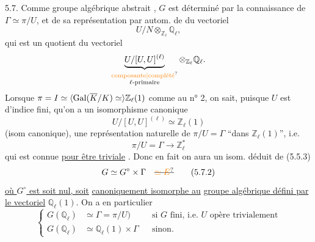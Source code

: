 5.7. Comme groupe algébrique abstrait , $G$ est déterminé par la connaissance de $\Gamma\simeq\pi/U$, et de sa représentation par autom. de  du vectoriel 
\[
U/N\otimes_{\mathbb Z_\ell}\mathbb Q_\ell,
\]
qui est un quotient du vectoriel
\[
\underbrace{U/[U,U]^{(\ell)}}_{\substack{\text{\unsure{composante|complété}}\\\ell\text{-primaire}}}\otimes_{\mathbb Z_\ell}\mathbb Q_\ell.
\]
Lorsque $\pi=I\simeq\inserted{\operatorname{Gal}(\overline K/K)\simeq}\mathbb Z_\ell(1)$ comme au n° 2,  on sait,  puisque $U$ est d'indice fini, qu'on a  un isomorphisme canonique
\[
U/[U,U]^{(\ell)}\simeq\mathbb Z_\ell(1)
\tag*{(5.7.1)}
\]
(isom canonique),  une représentation naturelle de $\pi/U=\Gamma$ ``dans $\mathbb Z_\ell(1)$'', i.e.
\[
\pi/U=\Gamma\longrightarrow\mathbb Z_\ell^*
\]
qui est connue \uline{pour être triviale} . Donc en fait on aura un isom.  déduit de (5.5.3)
\[
G\simeq G^\circ\times\Gamma\quad\deleted{\unsure{\simeq E}}
\tag*{(5.7.2)}
\]
 \uline{où $G^\circ$ est soit nul, soit}  \uline{canoniquement isomorphe au}  \uline{groupe algébrique défini par le vectoriel} $\mathbb Q_\ell(1)$. On a en particulier
\[
\left\{\begin{aligned}
G(\mathbb Q_\ell)&\simeq\Gamma=\pi/U)&&\text{si }G\text{ fini, i.e. }U\text{ opère trivialement}\\
G(\mathbb Q_\ell)&\simeq\mathbb Q_\ell(1)\times\Gamma&&\text{sinon.}
\end{aligned}\right.
\tag*{(5.7.3)}
\]

